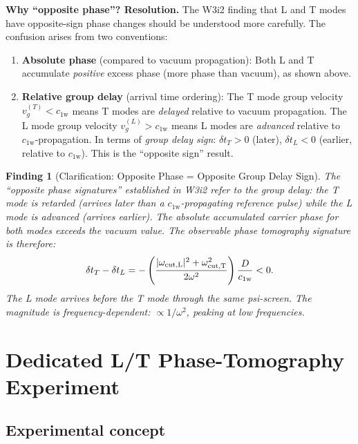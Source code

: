\documentclass[11pt]{article}
\newtheorem{finding}{Finding}
\newcommand{\cfield}{c_{1\mathrm{w}}}
\newcommand{\vgL}{v_g^{(L)}}
\newcommand{\vgT}{v_g^{(T)}}
\begin{document}
\noindent\textbf{Why ``opposite phase''? Resolution.}
The W3i2 finding that L and T modes have opposite-sign phase changes should be
understood more carefully. The confusion arises from two conventions:

\begin{enumerate}
\item \textbf{Absolute phase} (compared to vacuum propagation):
  Both L and T accumulate \emph{positive} excess phase (more phase than vacuum),
  as shown above.
\item \textbf{Relative group delay} (arrival time ordering):
  The T mode group velocity $\vgT < \cfield$ means T modes are \emph{delayed}
  relative to vacuum propagation. The L mode group velocity $\vgL > \cfield$ means
  L modes are \emph{advanced} relative to $\cfield$-propagation.
  In terms of \emph{group delay sign}: $\delta t_T > 0$ (later), $\delta t_L < 0$
  (earlier, relative to $\cfield$). This is the ``opposite sign'' result.
\end{enumerate}

\begin{finding}[Clarification: Opposite Phase = Opposite Group Delay Sign]
The ``opposite phase signatures'' established in W3i2 refer to the \emph{group
delay}: the T mode is retarded (arrives later than a $\cfield$-propagating
reference pulse) while the L mode is advanced (arrives earlier). The absolute
accumulated carrier phase for both modes exceeds the vacuum value. The
observable phase tomography signature is therefore:
\begin{equation}
\delta t_T - \delta t_L = -\left(\frac{|\omega_{\rm cut,L}|^2 + \omega_{\rm cut,T}^2}{2\omega^2}\right)\frac{D}{\cfield} < 0.
\label{eq:timing-diff}
\end{equation}
The L mode arrives \emph{before} the T mode through the same psi-screen.
The magnitude is frequency-dependent: $\propto 1/\omega^2$, peaking at low frequencies.
\end{finding}

\section{Dedicated L/T Phase-Tomography Experiment}
\label{sec:tomography-experiment}

\subsection{Experimental concept}
\end{document}
